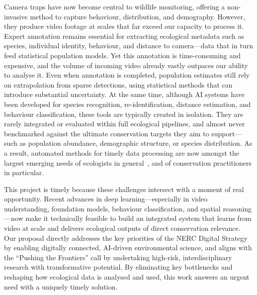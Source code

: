 Camera traps have now become central to wildlife monitoring, offering a non-invasive method to capture behaviour, distribution, and demography. However, they produce video footage at scales that far exceed our capacity to process it. Expert annotation remains essential for extracting ecological metadata such as species, individual identity, behaviour, and distance to camera—data that in turn feed statistical population models. Yet this annotation is time-consuming and expensive, and the volume of incoming video already vastly outpaces our ability to analyse it. Even when annotation is completed, population estimates still rely on extrapolation from sparse detections, using statistical methods that can introduce substantial uncertainty. At the same time, although AI systems have been developed for species recognition, re-identification, distance estimation, and behaviour classification, these tools are typically created in isolation. They are rarely integrated or evaluated within full ecological pipelines, and almost never benchmarked against the ultimate conservation targets they aim to support—such as population abundance, demographic structure, or species distribution. As a result, automated methods for timely data processing are now amongst the largest emerging needs of ecologists in general~\cite{Nathan2022}, and of conservation practitioners in particular.

This project is timely because these challenges intersect with a moment of real opportunity. Recent advances in deep learning—especially in video understanding, foundation models, behaviour classification, and spatial reasoning—now make it technically feasible to build an integrated system that learns from video at scale and delivers ecological outputs of direct conservation relevance. Our proposal directly addresses the key priorities of the NERC Digital Strategy by enabling digitally connected, AI-driven environmental science, and aligns with the “Pushing the Frontiers” call by undertaking high-risk, interdisciplinary research with transformative potential. By eliminating key bottlenecks and reshaping how ecological data is analysed and used, this work answers an urgent need with a uniquely timely solution.



